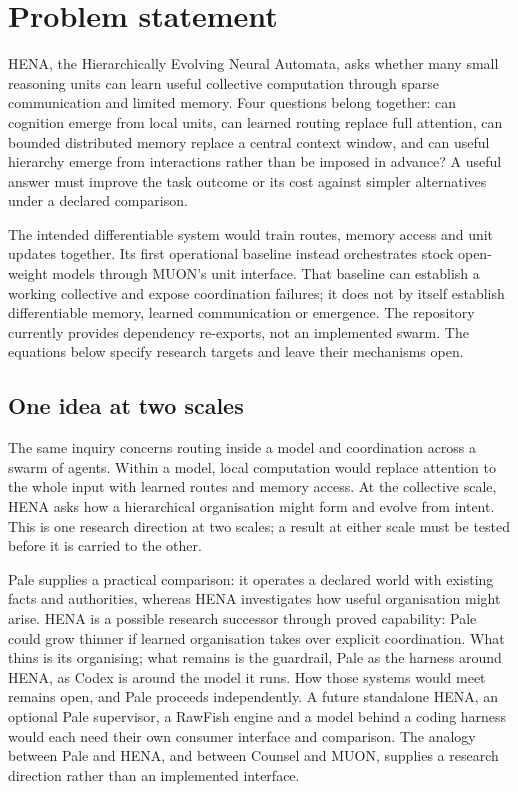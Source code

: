 \section{Problem statement}

HENA, the Hierarchically Evolving Neural Automata, asks whether many small reasoning units can learn useful collective computation through sparse communication and limited memory. Four questions belong together: can cognition emerge from local units, can learned routing replace full attention, can bounded distributed memory replace a central context window, and can useful hierarchy emerge from interactions rather than be imposed in advance? A useful answer must improve the task outcome or its cost against simpler alternatives under a declared comparison.

The intended differentiable system would train routes, memory access and unit updates together. Its first operational baseline instead orchestrates stock open-weight models through MUON's unit interface. That baseline can establish a working collective and expose coordination failures; it does not by itself establish differentiable memory, learned communication or emergence. The repository currently provides dependency re-exports, not an implemented swarm. The equations below specify research targets and leave their mechanisms open.

\subsection{One idea at two scales}

The same inquiry concerns routing inside a model and coordination across a swarm of agents. Within a model, local computation would replace attention to the whole input with learned routes and memory access. At the collective scale, HENA asks how a hierarchical organisation might form and evolve from intent. This is one research direction at two scales; a result at either scale must be tested before it is carried to the other.

Pale supplies a practical comparison: it operates a declared world with existing facts and authorities, whereas HENA investigates how useful organisation might arise. HENA is a possible research successor through proved capability: Pale could grow thinner if learned organisation takes over explicit coordination. What thins is its organising; what remains is the guardrail, Pale as the harness around HENA, as Codex is around the model it runs. How those systems would meet remains open, and Pale proceeds independently. A future standalone HENA, an optional Pale supervisor, a RawFish engine and a model behind a coding harness would each need their own consumer interface and comparison. The analogy between Pale and HENA, and between Counsel and MUON, supplies a research direction rather than an implemented interface.

